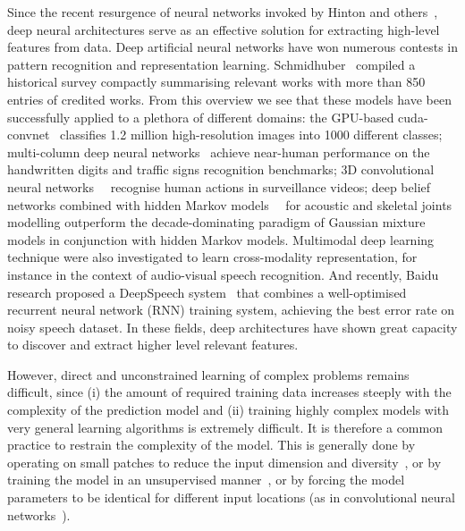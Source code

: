 Since the recent resurgence of neural networks invoked by Hinton and others~\cite{hinton2006fast},
deep neural architectures serve as an effective solution for extracting high-level features from data.
Deep artificial neural networks have won numerous contests in pattern recognition and representation learning.
Schmidhuber~\cite{schmidhuber2014deep} compiled a historical survey compactly summarising relevant works with more than 850 entries of credited works.
From this overview we see that these models have been successfully applied to a plethora of different domains: the GPU-based cuda-convnet~\cite{krizhevsky2012imagenet} classifies 1.2 million high-resolution images into 1000 different classes; multi-column deep neural networks~\cite{ciresan2012multi} achieve near-human performance on the handwritten digits and traffic signs recognition benchmarks; 3D convolutional neural networks~\cite{3dcnn}~\cite{ji20133d} recognise human actions in surveillance videos; deep belief networks combined with hidden Markov models~\cite{mohamed2012acoustic}~\cite{diwucvpr14} for acoustic and skeletal joints modelling outperform the decade-dominating paradigm of Gaussian mixture models in conjunction with hidden Markov models.
%
Multimodal deep learning technique were also investigated \cite{Ngiam2011multimodal} to learn cross-modality representation,
for instance in the context of audio-visual speech recognition.
%
And recently, Baidu research proposed a DeepSpeech system~\cite{hannun2014deepspeech} that combines a well-optimised recurrent neural network (RNN) training system, achieving the best error rate on noisy speech dataset. In these fields, deep architectures have shown great capacity to discover and extract higher level relevant features.

However, direct and unconstrained learning of complex problems remains difficult, since (i) the amount of required training data increases steeply with the complexity of the prediction model and (ii) training highly complex models with very general learning algorithms is extremely difficult. It is therefore a common practice to restrain the complexity of the model. This is generally done by operating on small patches to reduce the input dimension and diversity~\cite{baccouche2005spatio}, or by training the model in an unsupervised manner~\cite{le2011learning}, or by forcing the model parameters to be identical for different input locations (as in convolutional neural networks~\cite{krizhevsky2012imagenet,ciresan2012multi,3dcnn}).


